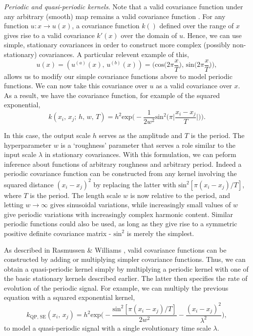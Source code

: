          \textit{Periodic and quasi-periodic kernels}. Note that a valid covariance function under any arbitrary (smooth) map remains a valid covariance function \cite{Roberts2013}. For any function \(u: x \to u(x)\), a covariance function \(k()\) defined over the range of \(x\) gives rise to a valid covariance \(k'(x)\) over the domain of \(u\). Hence, we can use simple, stationary covariances in order to construct more complex (possibly non-stationary) covariances. A particular relevent example of this, \[u(x) = (u^{(a)}(x),\, u^{(b)}(x)) = \bigg( \text{cos}\Big(2\pi\frac{x}{T} \Big),\, \text{sin}\Big(2\pi\frac{x}{T}\Big) \bigg),\] allows us to modify our simple covariance functions above to model periodic functions. We can now take this covariance over \(u\) as a valid covariance over \(x\). As a result, we have the covariance function, for example of the squared exponential, \[k(x_{i},\, x_{j};\, h,\, w,\, T) = h^2 \text{exp}\bigg( -\frac{1}{2w^2} \text{sin}^2\Big( \pi\Big|\frac{x_{i} - x_{j}}{T}\Big| \Big)\bigg).\]
         
         In this case, the output scale \(h\) serves as the amplitude and \(T\) is the period. The hyperparameter \(w\) is a `roughness' parameter that serves a role similar to the input scale \(\lambda\) in stationary covariances. With this formulation, we can peform inference about functions of arbitrary roughness and arbitrary period. Indeed a periodic covariance function can be constructed from any kernel involving the squared distance \((x_{i} - x_{j})^2\) by replacing the latter with \(\text{sin}^2[\pi(x_{i} - x_{j})/T]\), where \(T\) is the period. The length scale \(w\) is now relative to the period, and letting \(w \to \infty\) gives sinusoidal variations, while increasingly small values of \(w\) give periodic variations with increasingly complex harmonic content. Similar periodic functions could also be used, as long as they give rise to a symmetric positive definite covariance matrix - \(\text{sin}^2\) is merely the simplest.

         As described in Rasmussen \& Williams \cite{Rasmussen2006}, valid covariance functions can be constructed by adding or multiplying simpler covariance functions. Thus, we can obtain a quasi-periodic kernel simply by multiplying a periodic kernel with one of the basic stationary kernels described earlier. The latter then specifies the rate of evolution of the periodic signal. For example, we can multiply the previous equation with a squared exponential kernel, \[k_{\text{QP, SE}}(x_{i},\, x_{j}) = h^2 \text{exp}\bigg( -\frac{\text{sin}^2[ \pi(x_{i} - x_{j})/{T}]}{2w^2} - \frac{(x_{i} - x_{j})^2}{\lambda^2} \bigg),\] to model a quasi-periodic signal with a single evolutionary time scale \(\lambda\).

